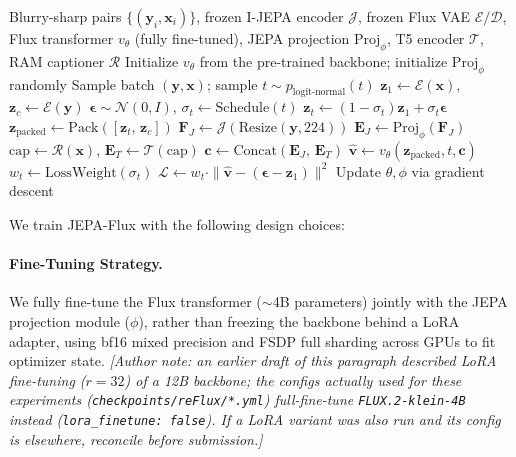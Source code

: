 \documentclass{article}
\begin{document}
\begin{algorithm}[t]
\caption{JEPA-Flux Training}
\label{alg:training}
\begin{algorithmic}[1]
\REQUIRE Blurry-sharp pairs $\{(\mathbf{y}_i, \mathbf{x}_i)\}$, frozen I-JEPA encoder $\mathcal{J}$, frozen Flux VAE $\mathcal{E}/\mathcal{D}$, Flux transformer $v_\theta$ (fully fine-tuned), JEPA projection $\text{Proj}_\phi$, T5 encoder $\mathcal{T}$, RAM captioner $\mathcal{R}$
\STATE Initialize $v_\theta$ from the pre-trained backbone; initialize $\text{Proj}_\phi$ randomly
    \STATE Sample batch $(\mathbf{y}, \mathbf{x})$; sample $t \sim p_{\text{logit-normal}}(t)$
    \STATE $\mathbf{z}_1 \leftarrow \mathcal{E}(\mathbf{x})$, \quad $\mathbf{z}_c \leftarrow \mathcal{E}(\mathbf{y})$ \hfill{}
    \STATE $\boldsymbol{\epsilon} \sim \mathcal{N}(0, I)$, \quad $\sigma_t \leftarrow \text{Schedule}(t)$
    \STATE $\mathbf{z}_t \leftarrow (1 - \sigma_t)\mathbf{z}_1 + \sigma_t \boldsymbol{\epsilon}$ \hfill{}
    \STATE $\mathbf{z}_{\text{packed}} \leftarrow \text{Pack}([\mathbf{z}_t,\, \mathbf{z}_c])$ \hfill{}
    \STATE $\mathbf{F}_J \leftarrow \mathcal{J}(\text{Resize}(\mathbf{y}, 224))$ \hfill{}
    \STATE $\mathbf{E}_J \leftarrow \text{Proj}_\phi(\mathbf{F}_J)$ \hfill{}
    \STATE $\text{cap} \leftarrow \mathcal{R}(\mathbf{x})$, \quad $\mathbf{E}_T \leftarrow \mathcal{T}(\text{cap})$ \hfill{}
    \STATE $\mathbf{c} \leftarrow \text{Concat}(\mathbf{E}_J,\, \mathbf{E}_T)$ \hfill{}
    \STATE $\hat{\mathbf{v}} \leftarrow v_\theta(\mathbf{z}_{\text{packed}}, t, \mathbf{c})$ \hfill{}
    \STATE $w_t \leftarrow \text{LossWeight}(\sigma_t)$ \hfill{}
    \STATE $\mathcal{L} \leftarrow w_t \cdot \|\hat{\mathbf{v}} - (\boldsymbol{\epsilon} - \mathbf{z}_1)\|^2$ \hfill{}
    \STATE Update $\theta, \phi$ via gradient descent
\ENDFOR
\end{algorithmic}
\end{algorithm}

We train JEPA-Flux with the following design choices:

\paragraph{Fine-Tuning Strategy.}
We fully fine-tune the Flux transformer ($\sim$4B parameters) jointly with the JEPA projection module ($\phi$), rather than freezing the backbone behind a LoRA adapter, using bf16 mixed precision and FSDP full sharding across GPUs to fit optimizer state. \textit{[Author note: an earlier draft of this paragraph described LoRA fine-tuning ($r=32$) of a 12B backbone; the configs actually used for these experiments (\texttt{checkpoints/reFlux/*.yml}) full-fine-tune \texttt{FLUX.2-klein-4B} instead (\texttt{lora\_finetune: false}). If a LoRA variant was also run and its config is elsewhere, reconcile before submission.]}
\end{document}
